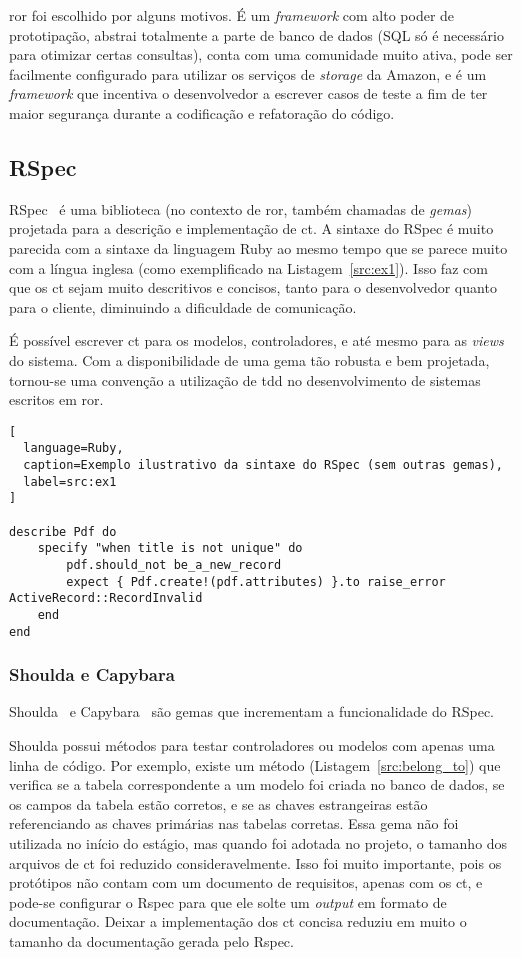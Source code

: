 \gls{ror} foi escolhido por alguns motivos. É um \textit{framework} com alto poder de prototipação, abstrai totalmente
a parte de banco de dados (SQL só é necessário para otimizar certas consultas), conta com uma comunidade muito ativa,
pode ser facilmente configurado para utilizar os serviços de \textit{storage} da Amazon, e é um \textit{framework} que
incentiva o desenvolvedor a escrever casos de teste a fim de ter maior segurança durante a codificação e refatoração do código.

\subsection{RSpec}

RSpec~\cite{RSpec} é uma biblioteca (no contexto de \gls{ror}, também chamadas de \textit{gemas}) projetada para a descrição e implementação de
\gls{ct}. A sintaxe do RSpec é muito parecida com a sintaxe da linguagem Ruby ao mesmo tempo que se parece muito com a língua inglesa
(como exemplificado na Listagem~\ref{src:ex1}).
Isso faz com que os \gls{ct} sejam muito descritivos e concisos, tanto para o desenvolvedor quanto para o cliente, diminuindo a dificuldade
de comunicação.

É possível escrever \gls{ct} para os modelos, controladores, e até mesmo para as \textit{views} do sistema. Com a disponibilidade de uma gema
tão robusta e bem projetada, tornou-se uma convenção a utilização de \gls{tdd} no desenvolvimento de sistemas escritos em \gls{ror}.

\begin{lstlisting}[
  language=Ruby,
  caption=Exemplo ilustrativo da sintaxe do RSpec (sem outras gemas),
  label=src:ex1
]

describe Pdf do
	specify "when title is not unique" do
		pdf.should_not be_a_new_record
		expect { Pdf.create!(pdf.attributes) }.to raise_error ActiveRecord::RecordInvalid
	end
end

\end{lstlisting}

\subsubsection{Shoulda e Capybara}

Shoulda~\cite{Shoulda} e Capybara~\cite{Capybara} são gemas que incrementam a funcionalidade do RSpec.

Shoulda possui métodos para testar controladores ou modelos com apenas uma linha de código. Por exemplo, existe um método (Listagem~\ref{src:belong_to})
que verifica se a tabela correspondente
a um modelo foi criada no banco de dados, se os campos da tabela estão corretos, e se as chaves estrangeiras estão referenciando as chaves primárias nas 
tabelas corretas. Essa gema não foi utilizada no início do estágio, mas quando foi adotada no projeto, o tamanho dos arquivos de \gls{ct} foi reduzido 
consideravelmente. Isso foi muito importante, pois os protótipos não contam com um documento de requisitos, apenas com os \gls{ct}, e pode-se 
configurar o Rspec para que ele solte um \textit{output} em formato de documentação. Deixar a implementação dos \gls{ct} concisa reduziu em muito 
o tamanho da documentação gerada pelo Rspec.

